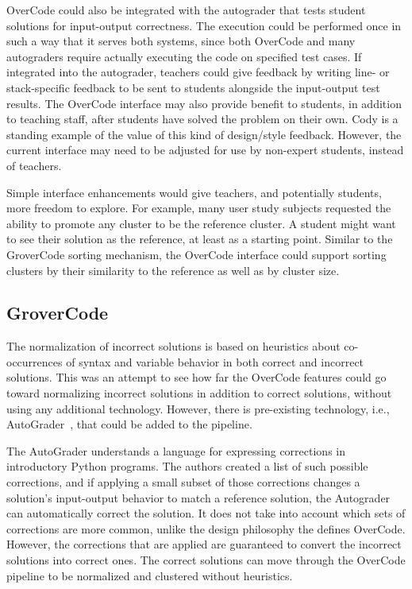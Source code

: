 OverCode could also be integrated with the autograder that tests student solutions for input-output correctness. The execution could be performed once in such a way that it serves both systems, since both OverCode and many autograders require actually executing the code on specified test cases. If integrated into the autograder, teachers could give feedback by writing line- or stack-specific feedback to be sent to students alongside the input-output test results. The OverCode interface may also provide benefit to students, in addition to teaching staff, after students have solved the problem on their own. Cody is a standing example of the value of this kind of design/style feedback. However, the current interface may need to be adjusted for use by non-expert students, instead of teachers. %

Simple interface enhancements would give teachers, and potentially students, more freedom to explore. For example, many user study subjects requested the ability to promote any cluster to be the reference cluster. A student might want to see their solution as the reference, at least as a starting point. Similar to the GroverCode sorting mechanism, the OverCode interface could support sorting clusters by their similarity to the reference as well as by cluster size. 


\subsection{GroverCode}

The normalization of incorrect solutions is based on heuristics about co-occurrences of syntax and variable behavior in both correct and incorrect solutions. This was an attempt to see how far the OverCode features could go toward normalizing incorrect solutions in addition to correct solutions, without using any additional technology. However, there is pre-existing technology, i.e., AutoGrader~\cite{autograder}, that could be added to the pipeline. 

The AutoGrader understands a language for expressing corrections in introductory Python programs. The authors created a list of such possible corrections, and if applying a small subset of those corrections changes a solution's input-output behavior to match a reference solution, the Autograder can automatically correct the solution. It does not take into account which sets of corrections are more common, unlike the design philosophy the defines OverCode. However, the corrections that are applied are guaranteed to convert the incorrect solutions into correct ones. The correct solutions can move through the OverCode pipeline to be normalized and clustered without heuristics. 

